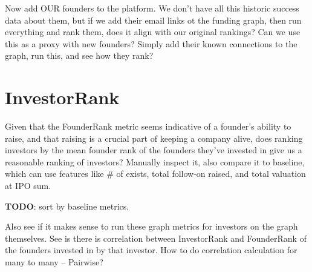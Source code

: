 Now add OUR founders to the platform. We don't have all this historic success data about them, but if we add their email links ot the funding graph, then run everything and rank them, does it align with our original rankings? Can we use this as a proxy with new founders? Simply add their known connections to the graph, run this, and see how they rank?

\section{InvestorRank}

Given that the FounderRank metric seems indicative of a founder's ability to raise, and that raising is a crucial part of keeping a company alive, does ranking investors by the mean founder rank of the founders they've invested in give us a reasonable ranking of investors? Manually inspect it, also compare it to baseline, which can use features like \# of exists, total follow-on raised, and total valuation at IPO sum.

\textbf{TODO}: sort by baseline metrics.

Also see if it makes sense to run these graph metrics for investors on the graph themselves. See is there is correlation between InvestorRank and FounderRank of the founders invested in by that investor. How to do correlation calculation for many to many -- Pairwise?
